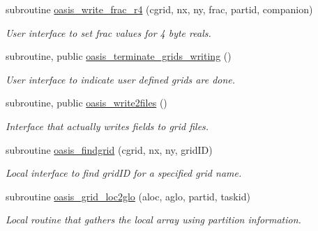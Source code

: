 \begin{DoxyCompactItemize}
subroutine \hyperlink{namespacemod__oasis__grid_ac6cd6ea8952c6e6df18a80d36c1f95f9}{oasis\+\_\+write\+\_\+frac\+\_\+r4} (cgrid, nx, ny, frac, partid, companion)
\begin{DoxyCompactList}\small\item\em User interface to set frac values for 4 byte reals. \end{DoxyCompactList}\item 
subroutine, public \hyperlink{namespacemod__oasis__grid_a59755e271ccdd0c98807b5938ef33e78}{oasis\+\_\+terminate\+\_\+grids\+\_\+writing} ()
\begin{DoxyCompactList}\small\item\em User interface to indicate user defined grids are done. \end{DoxyCompactList}\item 
subroutine, public \hyperlink{namespacemod__oasis__grid_a275791c512cefae9799e188d92b6f9d4}{oasis\+\_\+write2files} ()
\begin{DoxyCompactList}\small\item\em Interface that actually writes fields to grid files. \end{DoxyCompactList}\item 
subroutine \hyperlink{namespacemod__oasis__grid_aa1b2c3dc81299472185c1e7142d143e0}{oasis\+\_\+findgrid} (cgrid, nx, ny, grid\+ID)
\begin{DoxyCompactList}\small\item\em Local interface to find grid\+ID for a specified grid name. \end{DoxyCompactList}\item 
subroutine \hyperlink{namespacemod__oasis__grid_a5aba1fce549be5f9db2fda5374d588e1}{oasis\+\_\+grid\+\_\+loc2glo} (aloc, aglo, partid, taskid)
\begin{DoxyCompactList}\small\item\em Local routine that gathers the local array using partition information. \end{DoxyCompactList}\end{DoxyCompactItemize}
